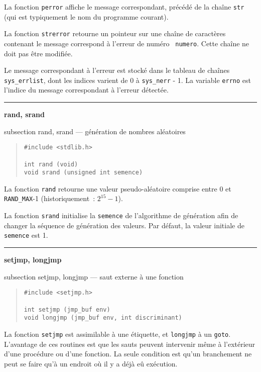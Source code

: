 \documentclass [twoside] {report}
\newcommand {\primitive} [1]
    {
	{\large \bf #1}
	\addcontentsline {toc} {subsection} {#1}
    }
\newcommand {\separation}
    {
	\vspace {7mm}
	\nopagebreak
	\hrule
    }
\begin{document}
La fonction {\tt perror} affiche le message correspondant,
précédé de la chaîne {\tt str} (qui est typiquement le nom du programme
courant).

La fonction {\tt strerror} retourne un pointeur sur une chaîne de
caractères contenant le message correspond à l'erreur de numéro {\tt
numero}. Cette chaîne ne doit pas être modifiée.

Le message correspondant à l'erreur est stocké dans le
tableau de chaînes {\tt sys\_errlist}, dont les indices varient
de 0 à {\tt sys\_nerr} - 1. La variable {\tt errno} est l'indice du
message correspondant à l'erreur détectée.





\separation 
\primitive {rand, srand} --- génération de nombres aléatoires

\begin {quote}
\begin {verbatim}
#include <stdlib.h>

int rand (void)
void srand (unsigned int semence)
\end{verbatim}
\end {quote}

La fonction {\tt rand} retourne une valeur pseudo-aléatoire comprise
entre 0 et \texttt {RAND\_MAX}-1 (historiquement~: $2^{15}-1$).

La fonction {\tt srand} initialise la {\tt semence} de l'algorithme de
génération afin de changer la séquence de génération des valeurs.
Par défaut, la valeur initiale de {\tt semence} est 1.




\separation 
\primitive {setjmp, longjmp} --- saut externe à une fonction

\begin {quote}
\begin {verbatim}
#include <setjmp.h>

int setjmp (jmp_buf env)
void longjmp (jmp_buf env, int discriminant)
\end{verbatim}
\end {quote}

La fonction {\tt setjmp} est assimilable à une étiquette, et
{\tt longjmp} à un {\tt goto}. L'avantage de ces routines est que
les sauts peuvent intervenir même à l'extérieur d'une
procédure ou d'une fonction. La seule condition est qu'un
branchement ne peut se faire qu'à un endroit où il y a déjà
eû exécution.
\end{document}
